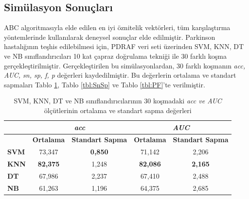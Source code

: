 \documentclass[conference]{IEEEtran}
\begin{document}
\subsection{Simülasyon Sonuçları}

ABC algoritmasıyla elde edilen en iyi öznitelik vektörleri, tüm karşılaştırma yöntemlerinde kullanılarak deneysel sonuçlar elde edilmiştir. Parkinson hastalığının teşhis edilebilmesi için, PDRAF veri seti üzerinden SVM, KNN, DT ve NB sınıflandırıcıları 10 kat çapraz doğrulama tekniği ile $30$ farklı koşma gerçekleştirilmiştir. Gerçekleştirilen bu simülasyonlardan, $30$ farklı koşmanın \textit{acc, AUC, sn, sp, f, p} değerleri kaydedilmiştir. Bu değerlerin ortalama ve standart sapmaları Tablo \ref{tbl:AccAuc}, Tablo \ref{tbl:SnSp} ve Tablo \ref{tbl:PF}’te verilmiştir.
%
\begin{table}[h]
	\centering
	\begin{tabular}{|l|c|c|c|c|}
		\hline
		& \multicolumn{2}{c|}{\textit{\textbf{acc}}}  & \multicolumn{2}{c|}{\textit{\textbf{AUC}}}     \\ \hline
		& \textbf{Ortalama} & \textbf{Standart Sapma} & \textbf{Ortalama}    & \textbf{Standart Sapma} \\ \hline
		\textbf{SVM} & 73,347       & \textbf{0,850}    & 71,142         & 2,206             \\ \hline
		\textbf{KNN} & \textbf{82,375}   & 1,248             & \textbf{82,086} & \textbf{2,165}    \\ \hline
		\textbf{DT}  & 67,986       & 2,237             & 67,410          & 2,488             \\ \hline
		\textbf{NB}  & 61,263       & 1,196             & 64,375          & 2,685              \\ \hline
	\end{tabular}
	\caption{SVM, KNN, DT ve NB sınıflandırıcılarının $30$ koşmadaki \textit{acc ve AUC} ölçütlerinin ortalama ve standart sapma değerleri}
	\label{tbl:AccAuc}
\end{table}
%
\end{document}
